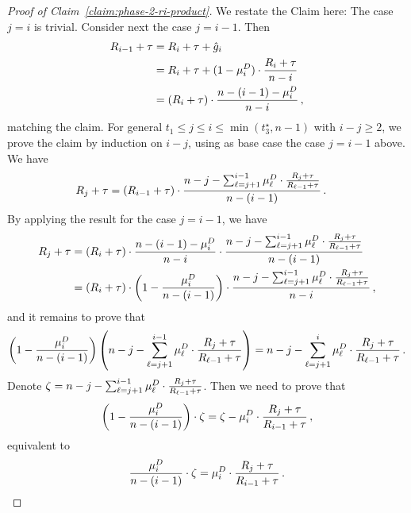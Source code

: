 \begin{proof}[Proof of Claim~\ref{claim:phase-2-ri-product}]
    We restate the Claim here:
    \claimphasetworiproduct*
    The case $j = i$ is trivial. Consider next the case $j = i - 1$. Then
    \begin{align*}
    R_{i-1} + \tau
    &= R_i + \tau + \hat{g}_i\\
    &= R_i + \tau + (1 - \mu_i^D) \cdot \frac{R_i + \tau}{n - i}\\
    &= \left(R_i + \tau\right) \cdot \frac{n - (i - 1) - \mu_i^D}{n - i}\,,
    \end{align*}
    matching the claim. For general $t_1 \leq j \leq i \leq \min(t_3^\star, n-1)$ with $i - j \geq 2$, we prove the claim by induction on $i - j$, using as base case the case $j=i-1$ above. We have
    \begin{align*}
    R_{j} + \tau
    &= \left(R_{i - 1} + \tau\right) \cdot \frac{n - j - \sum_{\ell = j + 1}^{i - 1} \mu_{\ell}^D \cdot \frac{R_j + \tau}{R_{\ell - 1} + \tau}}{n - (i - 1)}\,.
    \end{align*}
    By applying the result for the case $j = i-1$, we have
    \begin{align*}
    R_{j} + \tau
    &= \left(R_{i} + \tau\right) \cdot \frac{n - (i - 1) - \mu_i^D}{n - i} \cdot \frac{n - j - \sum_{\ell = j + 1}^{i - 1} \mu_{\ell}^D \cdot \frac{R_j + \tau}{R_{\ell - 1} + \tau}}{n - (i - 1)}\\
    &= \left(R_{i} + \tau\right) \cdot \left(1 - \frac{\mu_i^D}{n - (i - 1)}\right) \cdot \frac{n - j - \sum_{\ell = j + 1}^{i - 1} \mu_{\ell}^D \cdot \frac{R_j + \tau}{R_{\ell - 1} + \tau}}{n - i}\,,
    \end{align*}
    and it remains to prove that
    \begin{equation*}\left(1 - \frac{\mu_i^D}{n - (i - 1)}\right) \left(n - j - \sum_{\ell = j + 1}^{i - 1} \mu_{\ell}^D \cdot \frac{R_j + \tau}{R_{\ell - 1} + \tau}\right) = n - j - \sum_{\ell = j + 1}^{i} \mu_{\ell}^D \cdot \frac{R_j + \tau}{R_{\ell - 1} + \tau}\,.\end{equation*}
    Denote $\zeta = n - j - \sum_{\ell = j + 1}^{i-1} \mu_{\ell}^D \cdot \frac{R_j + \tau}{R_{\ell - 1} + \tau}$. Then we need to prove that
    \begin{equation*}\left(1 - \frac{\mu_i^D}{n - (i - 1)}\right) \cdot \zeta = \zeta - \mu_i^D \cdot \frac{R_j + \tau}{R_{i - 1} + \tau}\,,\end{equation*}
    equivalent to
    \begin{equation*}\frac{\mu_i^D}{n - (i - 1)} \cdot \zeta = \mu_i^D \cdot \frac{R_j + \tau}{R_{i - 1} + \tau}\,.\end{equation*}

\end{proof}
